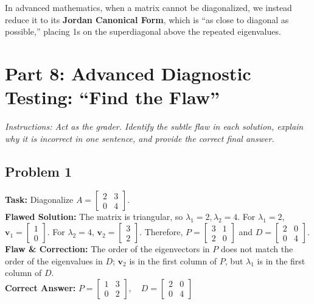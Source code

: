 \documentclass[11pt, a4paper]{article}
\theoremstyle{definition}
\theoremstyle{remark}
\begin{document}
In advanced mathematics, when a matrix cannot be diagonalized, we instead reduce it to its \textbf{Jordan Canonical Form}, which is ``as close to diagonal as possible,'' placing 1s on the superdiagonal above the repeated eigenvalues.

\section{Part 8: Advanced Diagnostic Testing: ``Find the Flaw''}

\textit{Instructions: Act as the grader. Identify the subtle flaw in each solution, explain why it is incorrect in one sentence, and provide the correct final answer.}

\subsection{Problem 1}
\textbf{Task:} Diagonalize $A = \begin{bmatrix} 2 & 3 \\ 0 & 4 \end{bmatrix}$. \\
\textbf{Flawed Solution:} The matrix is triangular, so $\lambda_1 = 2, \lambda_2 = 4$. For $\lambda_1=2$, $\mathbf{v}_1 = \begin{bmatrix} 1 \\ 0 \end{bmatrix}$. For $\lambda_2=4$, $\mathbf{v}_2 = \begin{bmatrix} 3 \\ 2 \end{bmatrix}$. Therefore, $P = \begin{bmatrix} 3 & 1 \\ 2 & 0 \end{bmatrix}$ and $D = \begin{bmatrix} 2 & 0 \\ 0 & 4 \end{bmatrix}$. \\
\textbf{Flaw \& Correction:} The order of the eigenvectors in $P$ does not match the order of the eigenvalues in $D$; $\mathbf{v}_2$ is in the first column of $P$, but $\lambda_1$ is in the first column of $D$. \\
\textbf{Correct Answer:} $\displaystyle P = \begin{bmatrix} 1 & 3 \\ 0 & 2 \end{bmatrix}, \quad D = \begin{bmatrix} 2 & 0 \\ 0 & 4 \end{bmatrix}$
\end{document}

